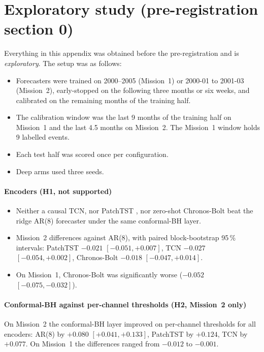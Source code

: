 \documentclass[preprint,12pt,authoryear]{elsarticle}
\begin{document}
\appendix
\section{Exploratory study (pre-registration section 0)}\label{app:explo}
Everything in this appendix was obtained before the pre-registration and is
\emph{exploratory}. The setup was as follows:
\begin{itemize}
\item Forecasters were trained on 2000--2005 (Mission~1) or 2000-01 to 2001-03 (Mission~2),
  early-stopped on the following three months or six weeks, and calibrated on the remaining
  months of the training half.
\item The calibration window was the last 9 months of the training half on Mission~1 and
  the last 4.5 months on Mission~2. The Mission~1 window holds 9 labelled events.
\item Each test half was scored once per configuration.
\item Deep arms used three seeds.
\end{itemize}

\paragraph{Encoders (H1, not supported)}
\begin{itemize}
\item Neither a causal TCN, nor PatchTST \citep{nie2023patchtst}, nor zero-shot Chronos-Bolt
  \citep{ansari2024chronos} beat the ridge AR(8) forecaster under the same conformal-BH
  layer.
\item Mission~2 differences against AR(8), with paired block-bootstrap 95\,\% intervals:
  PatchTST $-0.021$ $[-0.051,+0.007]$, TCN $-0.027$ $[-0.054,+0.002]$, Chronos-Bolt
  $-0.018$ $[-0.047,+0.014]$.
\item On Mission~1, Chronos-Bolt was significantly worse ($-0.052$ $[-0.075,-0.032]$).
\end{itemize}

\paragraph{Conformal-BH against per-channel thresholds (H2, Mission~2 only)}
On Mission~2 the conformal-BH layer improved on per-channel thresholds for all encoders:
AR(8) by $+0.080$ $[+0.041,+0.133]$, PatchTST by $+0.124$, TCN by $+0.077$. On Mission~1
the differences ranged from $-0.012$ to $-0.001$.
\end{document}
